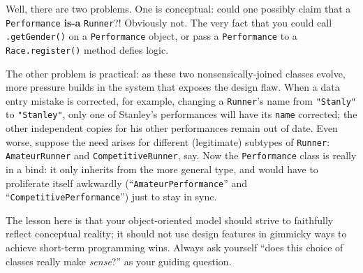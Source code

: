 Well, there are two problems. One is conceptual: could one possibly claim that
a \texttt{Performance} \textbf{is-a} \texttt{Runner}?! Obviously not. The very
fact that you could call \texttt{.getGender()} on a \texttt{Performance}
object, or pass a \texttt{Performance} to a \texttt{Race.register()}
method defies logic.

The other problem is practical: as these two nonsensically-joined classes
evolve, more pressure builds in the system that exposes the design flaw. When
a data entry mistake is corrected, for example, changing a \texttt{Runner}'s
name from \texttt{"Stanly"} to \texttt{"Stanley"}, only one of Stanley's
performances will have its \texttt{name} corrected; the other independent
copies for his other performances remain out of date. Even worse, suppose the
need arises for different (legitimate) subtypes of \texttt{Runner}:
\texttt{AmateurRunner} and \texttt{CompetitiveRunner}, say. Now
the \texttt{Performance} class is really in a bind: it only inherits from the
more general type, and would have to proliferate itself awkwardly
(``\texttt{AmateurPerformance}'' and ``\texttt{CompetitivePerformance}'') just
to stay in sync.

The lesson here is that your object-oriented model should strive to faithfully
reflect conceptual reality; it should not use design features in gimmicky ways
to achieve short-term programming wins. Always ask yourself ``does this choice
of classes really make \textit{sense}?'' as your guiding question.

